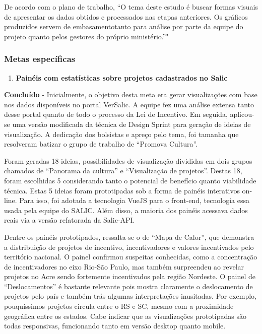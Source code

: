 De acordo com o plano de trabalho, ``O tema deste estudo é buscar formas
visuais de apresentar os dados obtidos e processados nas etapas
anteriores. Os gráficos produzidos servem de embasamentotanto para
análise por parte da equipe do projeto quanto pelos gestores do próprio
ministério.''"

\hypertarget{metas-especuxedficas-4}{%
\subsubsection{Metas específicas}\label{metas-especuxedficas-4}}

\begin{enumerate}
\def\labelenumi{\arabic{enumi}.}
\tightlist
\item
  \textbf{Painéis com estatísticas sobre projetos cadastrados no Salic}
\end{enumerate}

\textbf{Concluído} - Inicialmente, o objetivo desta meta era gerar
visualizações com base nos dados disponíveis no portal VerSalic. A
equipe fez uma análise extensa tanto desse portal quanto de todo o
processo da Lei de Incentivo. Em seguida, aplicou-se uma versão
modificada da técnica de Design Sprint para geração de ideias de
visualização. A dedicação dos bolsistas e apreço pelo tema, foi tamanha
que resolveram batizar o grupo de trabalho de ``Promova Cultura''.

Foram geradas 18 ideias, possibilidades de visualização divididas em
dois grupos chamados de ``Panorama da cultura'' e ``Visualização de
projetos''. Destas 18, foram escolhidas 5 considerando tanto o potencial
de benefício quanto viabilidade técnica. Estas 5 ideias foram
prototipadas sob a forma de painéis interativos on-line. Para isso, foi
adotada a tecnologia VueJS para o front-end, tecnologia essa usada pela
equipe do SALIC. Além disso, a maioria dos painéis acessava dados reais
via a versão refatorada da Salic-API.

Dentre os painéis prototipados, ressalta-se o de ``Mapa de Calor'', que
demonstra a distribuição de projetos de incentivo, incentivadores e
valores incentivados pelo território nacional. O painel confirmou
suspeitas conhecidas, como a concentração de incentivadores no eixo
Rio-São Paulo, mas também surpreendeu ao revelar projetos no Acre sendo
fortemente incentivados pela região Nordeste. O painel de
``Deslocamentos'' é bastante relevante pois mostra claramente o
deslocamento de projetos pelo país e também trás algumas interpretações
inusitadas. Por exemplo, pouquíssimos projetos circula entre o RS e SC,
mesmo com a proximidade geográfica entre os estados. Cabe indicar que as
visualizações prototipadas são todas responsivas, funcionando tanto em
versão desktop quanto mobile.

